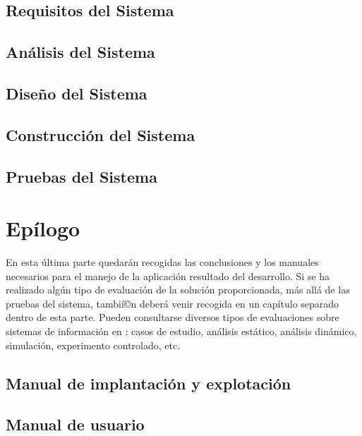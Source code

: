 \documentclass[a4paper,11pt]{book}
\begin{document}
\chapter{Requisitos del Sistema}


\chapter{Análisis del Sistema}


\chapter{Diseño del Sistema}


\chapter{Construcción del Sistema}


\chapter{Pruebas del Sistema}


\part{Epí­logo}
\null\vfill
\noindent En esta última parte quedarán recogidas las conclusiones y los manuales necesarios para el manejo de la aplicación resultado del desarrollo. Si se ha realizado algún tipo de evaluación de la solución proporcionada, más allá de las pruebas del sistema, tambií©n deberá venir recogida en un capí­tulo separado dentro de esta parte. Pueden consultarse diversos tipos de evaluaciones sobre sistemas de información en \cite{hevner2004}: casos de estudio, análisis estático, análisis dinámico, simulación, experimento controlado, etc.
\vfill

\chapter{Manual de implantación y explotación}


\chapter{Manual de usuario}

\end{document}

